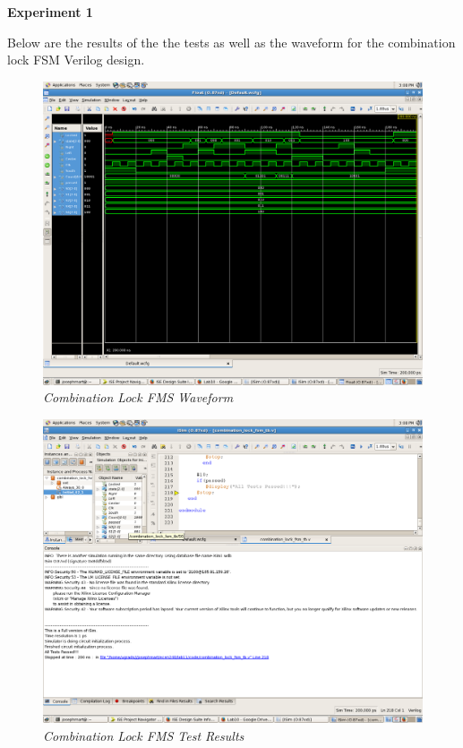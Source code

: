 \documentclass[a4paper,12pt]{article}
\begin{document}
\textbf{Experiment 1}

Below are the results of the the tests as well as the waveform for the combination lock FSM Verilog design.

\newpage

\begin{figure}[h]
  \begin{center}
    \includegraphics[scale=.1]{Exp1WaveForm.png}
    \caption{\textit{Combination Lock FMS Waveform}}
  \end{center}
\end{figure}

\begin{figure}[h]
  \begin{center}
    \includegraphics[scale=.1]{ExpTestResults.png}
    \caption{\textit{Combination Lock FMS Test Results}}
  \end{center}
\end{figure}
\end{document}
